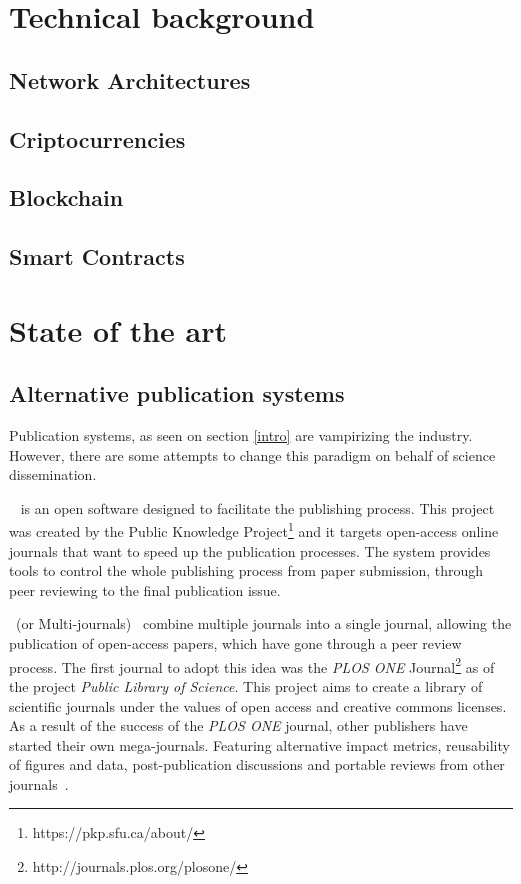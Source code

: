 \section{Technical background}
\label{tb}
\subsection{Network Architectures}
\label{tb:na}
\lip {}

\subsection{Criptocurrencies}
\label{tb:cryptos}
\lip

\subsection{Blockchain}
\label{tb:blockchain}
\lip

\subsection{Smart Contracts}
\label{tb:smartcontracts}
\lip

\section{State of the art}
\subsection{Alternative publication systems}
\label{soa:aps}
Publication systems, as seen on section \ref{intro} are vampirizing the
industry. However, there are some attempts to change this paradigm on behalf of
science dissemination.

~\cite{willinsky2005open} is an open software designed
to facilitate the publishing process. This project was created by the Public
Knowledge Project\footnote{https://pkp.sfu.ca/about/} and it targets open-access
online journals that want to speed up the publication processes. The system
provides tools to control the whole publishing process from paper submission,
through peer reviewing to the final publication issue.

~(or Multi-journals)~\cite{binfield2013open,wellen2013open}
combine multiple journals into a single journal, allowing the publication of
open-access papers, which have gone through a peer review process. The first
journal to adopt this idea was the \emph{PLOS ONE}
Journal\footnote{http://journals.plos.org/plosone/} as of the project
\emph{Public Library of Science}. This project aims to create a library of
scientific journals under the values of open access and creative commons
licenses. As a result of the success of the \emph{PLOS ONE} journal, other
publishers have started their own mega-journals. Featuring alternative impact
metrics, reusability of figures and data, post-publication discussions and
portable reviews from other journals~\cite{bjork2015have}.

